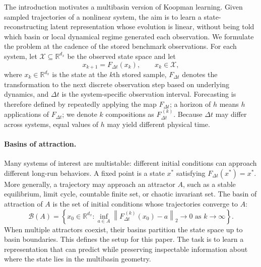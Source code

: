\documentclass[11pt]{article}
\newcommand{\R}{\mathbb{R}}
\newcommand{\norm}[1]{\left\lVert #1 \right\rVert}
\theoremstyle{plain}
\theoremstyle{definition}
\begin{document}
The introduction motivates a multibasin version of Koopman learning. Given sampled trajectories of a nonlinear system, the aim is to learn a state-reconstructing latent representation whose evolution is linear, without being told which basin or local dynamical regime generated each observation.
We formulate the problem at the cadence of the stored benchmark observations.
For each system, let \(\mathcal X\subseteq\R^{d_x}\) be the observed state space and let
\begin{equation}
    x_{k+1}=F_{\Delta t}(x_k),\qquad x_k\in\mathcal X,
    \label{eq:sampled_map}
\end{equation}
where $x_k\in\R^{d_x}$ is the state at the $k$th stored sample, $F_{\Delta t}$ denotes the transformation to the next discrete observation step based on underlying dynamics, and $\Delta t$ is the system-specific observation interval.
Forecasting is therefore defined by repeatedly applying the map $F_{\Delta t}$; a horizon of $h$ means $h$ applications of $F_{\Delta t}$; we denote $k$ compositions as $F_{\Delta t}^{\,(k)}$. Because $\Delta t$ may differ across systems, equal values of $h$ may yield different physical time.

\paragraph{Basins of attraction.} Many systems of interest are multistable: different initial conditions can approach different long-run behaviors.
A fixed point is a state $x^\ast$ satisfying $F_{\Delta t}(x^\ast)=x^\ast$.
More generally, a trajectory may approach an attractor $A$, such as a stable equilibrium, limit cycle, countable finite set, or chaotic invariant set.
The basin of attraction of $A$ is the set of initial conditions whose trajectories converge to $A$:
\begin{equation}
  \mathcal{B}(A)
  =
  \left\{
    x_0\in\R^{d_x}:
    \inf_{a\in A}\norm{F_{\Delta t}^{\,(k)}(x_0)-a}_2\!\to 0
    \text{ as } k\to\infty
  \right\}.
  \label{eq:basin}
\end{equation}
When multiple attractors coexist, their basins partition the state space up to basin boundaries. This defines the setup for this paper.
The task is to learn a representation that can predict while preserving inspectable information about where the state lies in the multibasin geometry.
\end{document}
